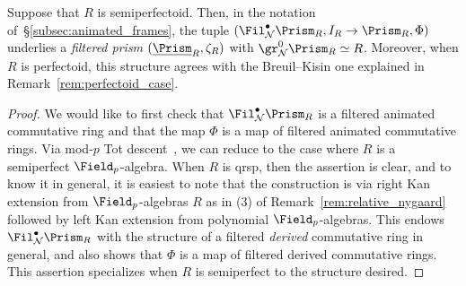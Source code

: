 \documentclass[10pt]{amsart}
\begin{document}
\begin{lemma}
\label{lem:nygaard_filtered_frame}
Suppose that $R$ is semiperfectoid. Then, in the notation of~\S\ref{subsec:animated_frames}, the tuple $(\Fil^\bullet_{\mathcal{N}}\Prism_{R},I_R\to \Prism_R,\Phi)$ underlies a \emph{filtered prism} $(\underline{\Prism}_{R},\zeta_R)$ with $\gr^0_{\mathcal{N}}\Prism_R\simeq R$. Moreover, when $R$ is perfectoid, this structure agrees with the Breuil--Kisin one explained in Remark~\ref{rem:perfectoid_case}.
\end{lemma}
\begin{proof}
We would like to first check that  $\Fil^\bullet_{\mathcal{N}}\Prism_R$ is a filtered animated commutative ring and that the map $\Phi$ is a map of filtered animated commutative rings. Via mod-$p$ Tot descent~\cite[Propositions 4.4.15, 5.5.24]{bhatt2022absolute}, we can reduce to the case where $R$ is a semiperfect $\Field_p$-algebra.  When $R$ is qrsp, then the assertion is clear, and to know it in general, it is easiest to note that the construction is via right Kan extension from $\Field_p$-algebras $R$ as in (3) of Remark~\ref{rem:relative_nygaard} followed by left Kan extension from polynomial $\Field_p$-algebras. This endows $\Fil^\bullet_{\mathcal{N}}\Prism_R$ with the structure of a filtered \emph{derived} commutative ring in general, and also shows that $\Phi$ is a map of filtered derived commutative rings. This assertion specializes when $R$ is semiperfect to the structure desired.


\end{proof}
\end{document}
